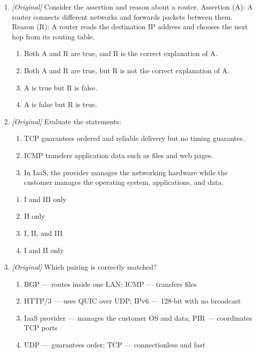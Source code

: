 \begin{enumerate}[label=\textbf{Q\arabic*.}, leftmargin=*]
\begin{enumerate}[label=\Alph*.]
      different routes; circuit switching holds one dedicated path.
    \item Circuit switching splits data into packets; packet switching holds a
      dedicated circuit.
    \item Both hold a dedicated path for the whole session.
    \item Both deliver packets with guaranteed timing.
  \end{enumerate}
\item \textit{[Original]} Consider the assertion and reason about a router.
  Assertion (A): A router connects different networks and forwards packets
  between them. Reason (R): A router reads the destination IP address and
  chooses the next hop from its routing table.
  \begin{enumerate}[label=\Alph*.]
    \item Both A and R are true, and R is the correct explanation of A.
    \item Both A and R are true, but R is not the correct explanation of A.
    \item A is true but R is false.
    \item A is false but R is true.
  \end{enumerate}
\item \textit{[Original]} Evaluate the statements:
  \begin{enumerate}[label=\Roman*.]
    \item TCP guarantees ordered and reliable delivery but no timing
      guarantee.
    \item ICMP transfers application data such as files and web pages.
    \item In IaaS, the provider manages the networking hardware while the
      customer manages the operating system, applications, and data.
  \end{enumerate}
  \begin{enumerate}[label=\Alph*.]
    \item I and III only
    \item II only
    \item I, II, and III
    \item I and II only
  \end{enumerate}
\item \textit{[Original]} Which pairing is correctly matched?
  \begin{enumerate}[label=\Alph*.]
    \item BGP --- routes inside one LAN; ICMP --- transfers files
    \item HTTP/3 --- uses QUIC over UDP; IPv6 --- 128-bit with no broadcast
    \item IaaS provider --- manages the customer OS and data; PIR ---
      coordinates TCP ports
    \item UDP --- guarantees order; TCP --- connectionless and fast
  \end{enumerate}


\end{enumerate}
